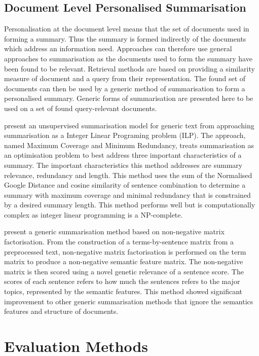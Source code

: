 \subsection{Document Level Personalised Summarisation}
\label{subsec:2.4.2}
Personalisation at the document level means that the set of documents used in forming a summary. Thus the summary is formed indirectly of the documents which address an information need. Approaches can therefore use general approaches to summarisation as the documents used to form the summary have been found to be relevant. Retrieval methods are based on providing a similarity measure of document and a query from their representation. The found set of documents can then be used by a generic method of summarisation to form a personalised summary. Generic forms of summarisation are presented here to be used on a set of found query-relevant documents.

\citet{alguliev2011mcmr} present an unsupervised summarisation model for generic text from approaching summarisation as a Integer Linear Programing problem (ILP). The approach, named Maximum Coverage and Minimum Redundancy, treats summarisation as an optimisation problem to best address three important characteristics of a summary. The important characteristics this method addresses are summary relevance, redundancy and length. This method uses the sum of the Normalised Google Distance and cosine similarity of sentence combination to determine a summary with maximum coverage and minimal redundancy that is constrained by a desired summary length. This method performs well but is computationally complex as integer linear programming is a NP-complete. 

\citet{park2008document} present a generic summarisation method based on non-negative matrix factorisation. From the construction of a terms-by-sentence matrix from a preprocessed text, non-negative matrix factorisation is performed on the term matrix to produce a non-negative semantic feature matrix. The non-negative matrix is then scored using a novel genetic relevance of a sentence score. The scores of each sentence refers to how much the sentences refers to the major topics, represented by the semantic features. This method showed significant improvement to other generic summarisation methods that ignore the semantics features and structure of documents.

\section{Evaluation Methods}
\label{sec:2.5}

